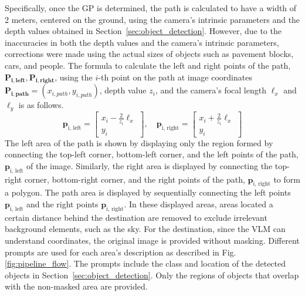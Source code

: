 Specifically, once the GP is determined, the path is calculated to have a width of 2 meters, centered on the ground, using the camera's intrinsic parameters and the depth values obtained in Section~\ref{sec:object_detection}. However, due to the inaccuracies in both the depth values and the camera's intrinsic parameters, corrections were made using the actual sizes of objects such as pavement blocks, cars, and people. The formula to calculate the left and right points of the path, $\mathbf{P_{i, left}, P_{i, right}}$, using the $i$-th point on the path at image coordinates $\mathbf{P_{i, path}} = (x_{i, path}, y_{i, path})$, depth value $z_i$, and the camera's focal length $\ell_x$ and $\ell_y$ is as follows.
\begin{equation}
\mathbf{p}_\text{i, left} = \begin{bmatrix} x_i -  \frac{2}{z_i}\ell_x \\ y_i \end{bmatrix}, \quad \mathbf{p}_\text{i, right} = \begin{bmatrix} x_i +  \frac{2}{z_i}\ell_x \\ y_i \end{bmatrix}
\end{equation}
The left area of the path is shown by displaying only the region formed by connecting the top-left corner, bottom-left corner, and the left points of the path, $\mathbf{p}_\text{i, left}$ of the image. Similarly, the right area is displayed by connecting the top-right corner, bottom-right corner, and the right points of the path, $\mathbf{p}_\text{i, right}$ to form a polygon. The path area is displayed by sequentially connecting the left points $\mathbf{p}_\text{i, left}$ and the right points $\mathbf{p}_\text{i, right}$. 
In these displayed areas, areas located a certain distance behind the destination are removed to exclude irrelevant background elements, such as the sky. 
For the destination, since the VLM can understand coordinates, the original image is provided without masking. 
Different prompts are used for each area’s description as described in Fig. \ref{fig:pipeline_flow}.
The prompts include the class and location 
of the detected objects in Section~\ref{sec:object_detection}. Only the regions of objects that overlap with the non-masked area are provided.

